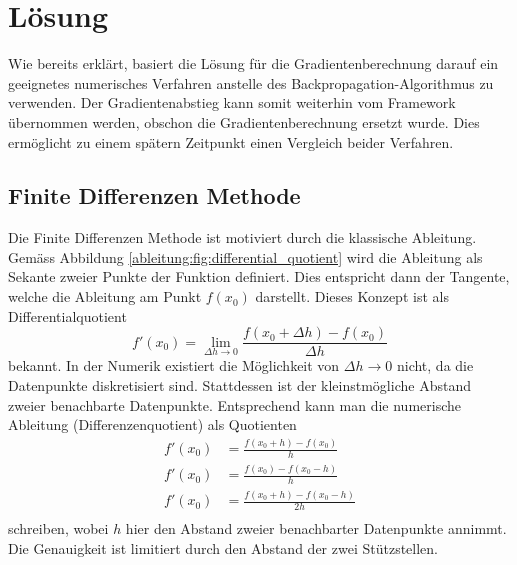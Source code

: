 %
%
%
\section{Lösung
\label{ableitung:section:loesung}}
Wie bereits erklärt, basiert die Lösung für die Gradientenberechnung darauf ein geeignetes numerisches Verfahren anstelle des Backpropagation-Algorithmus zu verwenden. Der Gradientenabstieg kann somit weiterhin vom Framework übernommen werden, obschon die Gradientenberechnung ersetzt wurde. Dies ermöglicht zu einem spätern Zeitpunkt einen Vergleich beider Verfahren.
\subsection{Finite Differenzen Methode}
Die Finite Differenzen Methode ist motiviert durch die klassische Ableitung. Gemäss Abbildung \ref{ableitung:fig:differential_quotient} wird die Ableitung als Sekante zweier Punkte der Funktion definiert. Dies entspricht dann der Tangente, welche die Ableitung am Punkt $f(x_0)$ darstellt.
Dieses Konzept ist als Differentialquotient
\begin{equation}
f'(x_0) = \lim_{{\Delta h} \rightarrow 0} \frac{f(x_0+\Delta h) - f(x_0)}{\Delta h}
\label{ableitung:equations:differentialquotient}
\end{equation}
bekannt. 
In der Numerik existiert die Möglichkeit von $\Delta h \rightarrow 0$ nicht, da die Datenpunkte diskretisiert sind. Stattdessen ist der kleinstmögliche Abstand zweier benachbarte Datenpunkte. Entsprechend kann man die numerische Ableitung (Differenzenquotient) als Quotienten
\begin{equation}
\begin{split}
f'(x_0) &= \frac{f(x_0 + h) - f(x_0)}{h} \\
f'(x_0) &= \frac{f(x_0) - f(x_0 - h)}{h} \\
f'(x_0) &= \frac{f(x_0 + h) - f(x_0 - h)}{2h} \\
\end{split}
\label{ableitung:equations:differenzenquotient}
\end{equation}
schreiben, wobei $h$ hier den Abstand zweier benachbarter Datenpunkte annimmt. Die Genauigkeit ist limitiert durch den Abstand der zwei Stützstellen.
